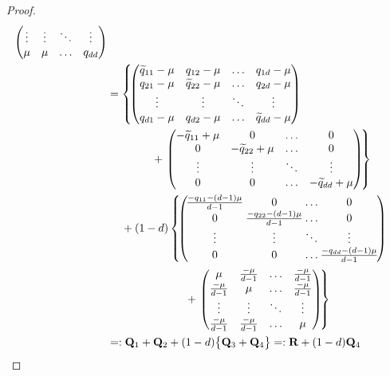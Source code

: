 \documentclass[9pt,twocolumn,twoside]{pnas-new}
\newcommand{\?}{\textbf{?}}
\newcommand{\QQ}{\mathbf{Q}}
\newcommand{\RM}{\mathbf{R}}
\begin{document}
\begin{proof}
\begin{align}
\begin{pmatrix}
\vdots & \vdots & \ddots & \vdots \\
\mu & \mu & \hdots & q_{dd} \\
\end{pmatrix} \notag \\
  &=\left\{\!
    \begin{pmatrix}
\widetilde{q}_{11}-\mu & q_{12}-\mu & \hdots & q_{1d}-\mu \\
q_{21}-\mu & \widetilde{q}_{22}-\mu & \hdots & q_{2d}-\mu \\
\vdots & \vdots & \ddots & \vdots \\
q_{d1}-\mu & q_{d2}-\mu & \hdots & \widetilde{q}_{dd}-\mu \\
\end{pmatrix}\right.
  \label{eq:En:or:Wigner}\\
& \qquad \quad \quad +
\left.\begin{pmatrix}
-\widetilde{q}_{11}+\mu & 0 & \hdots & 0 \\
0 & -\widetilde{q}_{22}+\mu & \hdots & 0 \\
\vdots & \vdots & \ddots & \vdots \\
0 & 0 & \hdots & -\widetilde{q}_{dd}+\mu \\
\end{pmatrix}\!\right\}
  \notag \\
  &\quad\;+ (1-d)
    \left\{ \!
    \left(\! \!\!\!
      \begin{array}{*{24}{c@{\hspace{2pt}}}}
\frac{-q_{11}-(d-1)\mu}{d-1} & 0 & \hdots & 0 \\
0 & \frac{-q_{22}-(d-1)\mu}{d-1} & \hdots & 0 \\
\vdots & \vdots & \ddots & \vdots \\
0 & 0 & \hdots & \frac{-q_{dd}-(d-1)\mu}{d-1}\\
    \end{array}
  \! \!  \right)
  \right.
  \notag\\ 
  &\qquad \qquad \qquad \quad+  \left. 
        \begin{pmatrix}
\mu & \frac{-\mu}{d-1} & \hdots & \frac{-\mu}{d-1} \\
\frac{-\mu}{d-1} & \mu & \hdots & \frac{-\mu}{d-1} \\
\vdots & \vdots & \ddots & \vdots \\
\frac{-\mu}{d-1} & \frac{-\mu}{d-1} & \hdots & \mu \\
\end{pmatrix}
  \!\right\}
  \label{e:Q_basic_decomp}\\
  &=: \QQ_1 + \QQ_2 + (1-d) \big\{\QQ_3 +  \QQ_4\big\}
  =: \RM + (1-d) \QQ_4  \label{e:Q1,Q2,Q3}
\end{align}


\end{proof}
\end{document}
